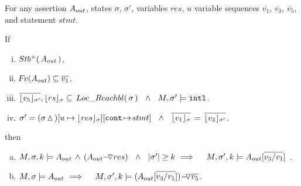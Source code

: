 
\begin{lemma}
\label{l:calls:return}

For any assertion $\Aout$, states $\sigma$, $\sigma'$, variables $res$, $u$ variable sequences  $\overline{v_1}$, $\overline{v_3}$,   $\overline{v_5}$,  and statement $stmt$.

\noindent
 If 
 
\begin{enumerate}[(i)]
\item 
\label{l:calls:r:one}
$ \Pos \Aout$,  
\item 
\label{l:callers:r:two}
$\fv(\Aout) \subseteq  \overline{v_1} $,
\item
$  \overline {\interpret {\sigma'} {v_5}}, {\interpret {\sigma} {rs}} \subseteq \LRelevantO \sigma  \ \ \wedge \ \  M, \sigma' \models \intThis$.
 \item
\label{l:callers:three}
\label{l:calls:return:three}
$\sigma'= (\sigma \popSymbol)[ u  \mapsto  {\interpret {\sigma} {res}}][\prg{cont}\!\mapsto\! stmt]
\ \ \wedge \ \   \overline {\interpret {\sigma} {v_1} }\, =\,  \overline {\interpret {\sigma'}  {v_3} }$.
  \end{enumerate}
  
\noindent
then

\begin{enumerate} [a.]
\item
\label{l:calls:caller:one}
$\satDAssertFrom M  \sigma k   {\Aout \, \wedge\,  {(\PushASLong  {res} {\Aout})} }\ \  \wedge\ \ \DepthSt {\sigma'} \geq k  \ 
 \hfill \Longrightarrow  \ \ \  \   \satDAssertFrom M  {\sigma'} k   {\Aout[\overline {v_3 / v_1}]  }$ .
 \item
 \label{l:calls:caller:two}
 $M, \sigma \models  {\Aout}\ %
 \hfill \Longrightarrow  \ \ \  \  %
 \satDAssertFrom M  {\sigma'} k   {\PushASLong  {\overline {v_5}}    {(\Aout[\overline { v_3/v_1}])} }$. 
\end{enumerate}

\end{lemma}


